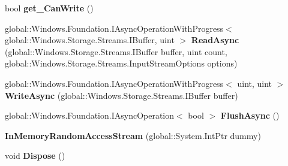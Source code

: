 \begin{DoxyCompactItemize}
\item 
\mbox{\label{class_windows_1_1_storage_1_1_streams_1_1_in_memory_random_access_stream_a6130af7a8779a5e32ddb40559aed883d}} 
bool {\bfseries get\+\_\+\+Can\+Write} ()
\item 
\mbox{\label{class_windows_1_1_storage_1_1_streams_1_1_in_memory_random_access_stream_add150174cbde0a2405293e8765f70bd3}} 
global\+::\+Windows.\+Foundation.\+I\+Async\+Operation\+With\+Progress$<$ global\+::\+Windows.\+Storage.\+Streams.\+I\+Buffer, uint $>$ {\bfseries Read\+Async} (global\+::\+Windows.\+Storage.\+Streams.\+I\+Buffer buffer, uint count, global\+::\+Windows.\+Storage.\+Streams.\+Input\+Stream\+Options options)
\item 
\mbox{\label{class_windows_1_1_storage_1_1_streams_1_1_in_memory_random_access_stream_a812f40b23e43e9921ef7cc08a4bb0a58}} 
global\+::\+Windows.\+Foundation.\+I\+Async\+Operation\+With\+Progress$<$ uint, uint $>$ {\bfseries Write\+Async} (global\+::\+Windows.\+Storage.\+Streams.\+I\+Buffer buffer)
\item 
\mbox{\label{class_windows_1_1_storage_1_1_streams_1_1_in_memory_random_access_stream_a43197e973b559a363116945f30e5a6da}} 
global\+::\+Windows.\+Foundation.\+I\+Async\+Operation$<$ bool $>$ {\bfseries Flush\+Async} ()
\item 
\mbox{\label{class_windows_1_1_storage_1_1_streams_1_1_in_memory_random_access_stream_a58fe83e628070875813e711cb730b9e1}} 
{\bfseries In\+Memory\+Random\+Access\+Stream} (global\+::\+System.\+Int\+Ptr dummy)
\item 
\mbox{\label{class_windows_1_1_storage_1_1_streams_1_1_in_memory_random_access_stream_a46eac03da7bc9cadfb0e54b02113e49d}} 
void {\bfseries Dispose} ()
\item 
\mbox{\label{class_windows_1_1_storage_1_1_streams_1_1_in_memory_random_access_stream_aa647257f534704ae03fa50c86a98f839}} 

\end{DoxyCompactItemize}
